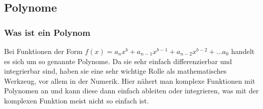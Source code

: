 \subsection{Polynome} \label{polynom}
\subsubsection{Was ist ein Polynom}
Bei Funktionen der Form $f(x) = a_n x^b + a_{n-1} x^{b-1} + a_{n-2} x^{b-2} + ... a_0$ handelt es sich um so genannte Polynome. Da sie sehr einfach differenzierbar und integrierbar sind, haben sie eine sehr wichtige Rolle als mathematisches Werkzeug, vor allem in der Numerik. Hier nähert man komplexe Funktionen mit Polynomen an und kann diese dann einfach ableiten oder integrieren, was mit der komplexen Funktion meist nicht so einfach ist.

